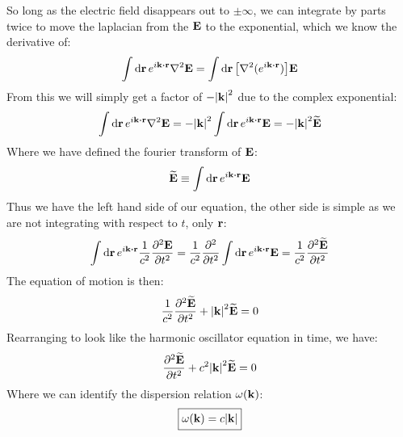 \documentclass[12pt]{article}
\begin{document}
So long as the electric field disappears out to $\pm\infty$, we can integrate by parts twice to move the laplacian from the $\vb{E}$ to the exponential, which we know the derivative of:
\begin{align*}
  \int\dd{\vb{r}}e^{i\vb{k}\vdot\vb{r}}\laplacian{\vb{E}}=
  \int\dd{\vb{r}}\qty[\laplacian{(e^{i\vb{k}\vdot\vb{r}})}]\vb{E}
\end{align*}
From this we will simply get a factor of $-\abs{\vb{k}}^2$ due to the complex exponential:
\begin{align*}
  \int\dd{\vb{r}}e^{i\vb{k}\vdot\vb{r}}\laplacian{\vb{E}}=
  -\abs{\vb{k}}^2\int\dd{\vb{r}}e^{i\vb{k}\vdot\vb{r}}\vb{E}
  =-\abs{\vb{k}}^2\widetilde{\vb{E}}
\end{align*}
Where we have defined the fourier transform of $\vb{E}$:
\begin{align*}
  \widetilde{\vb{E}}\equiv\int\dd{\vb{r}}e^{i\vb{k}\vdot\vb{r}}\vb{E}
\end{align*}
Thus we have the left hand side of our equation, the other side is simple as we are not integrating with respect to $t$, only $\vb{r}$:
\begin{align*}
  \int\dd{\vb{r}}e^{i\vb{k}\vdot\vb{r}}\frac1{c^2}\pdv[2]{\vb{E}}{t}=
  \frac1{c^2}\pdv[2]{t}\int\dd{\vb{r}}e^{i\vb{k}\vdot\vb{r}}\vb{E}=
  \frac1{c^2}\pdv[2]{\widetilde{\vb{E}}}{t}
\end{align*}
The equation of motion is then:
\begin{align*}
  \frac1{c^2}\pdv[2]{\widetilde{\vb{E}}}{t}+\abs{\vb{k}}^2\widetilde{\vb{E}}=0
\end{align*}
Rearranging to look like the harmonic oscillator equation in time, we have:
\begin{align*}
  \pdv[2]{\widetilde{\vb{E}}}{t}+c^2\abs{\vb{k}}^2\widetilde{\vb{E}}=0
\end{align*}
Where we can identify the dispersion relation $\omega(\vb{k})$:
\begin{equation}
  \boxed{
    \begin{aligned}
      \omega(\vb{k})=c\abs{\vb{k}}
    \end{aligned}
  }
\end{equation}
\end{document}

